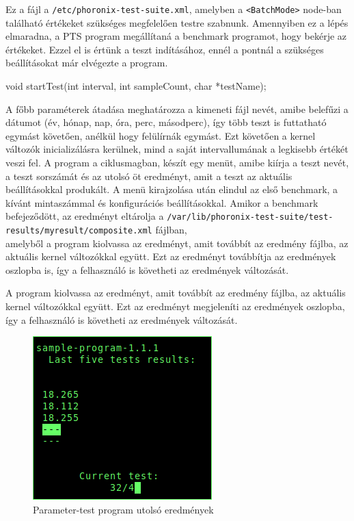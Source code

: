 Ez a fájl a \texttt{/etc/phoronix-test-suite.xml}, amelyben a \texttt{<BatchMode>} node-ban található értékeket szükséges megfelelően testre szabnunk. Amennyiben ez a lépés elmaradna, a PTS program megállítaná a benchmark programot, hogy bekérje az értékeket. Ezzel el is értünk a teszt indításához, ennél a pontnál a szükséges beállításokat már elvégezte a program.
\begin{cpp}
void startTest(int interval, int sampleCount, char *testName);
\end{cpp}
A főbb paraméterek átadása meghatározza a kimeneti fájl nevét, amibe belefűzi a dátumot (év, hónap, nap, óra, perc, másodperc), így több teszt is futtatható egymást követően, anélkül hogy felülírnák egymást.
Ezt követően a kernel változók inicializálásra kerülnek, mind a saját intervallumának a legkisebb értékét veszi fel. A program a ciklusmagban, készít egy menüt, amibe kiírja a teszt nevét, a teszt sorszámát és az utolsó öt eredményt, amit a teszt az aktuális beállításokkal produkált. A menü kirajzolása után elindul az első benchmark, a kívánt mintaszámmal és konfigurációs beállításokkal. Amikor a benchmark befejeződött, az eredményt eltárolja a \texttt{/var/lib/phoronix-test-suite/test-results/myresult/composite.xml} fájlban, \\ amelyből a program kiolvassa az eredményt, amit továbbít az eredmény fájlba, az aktuális kernel változókkal együtt. Ezt az eredményt továbbítja az eredmények oszlopba is, így a felhasználó is követheti az eredmények változását.

\noindent A program kiolvassa az eredményt, amit továbbít az eredmény fájlba, az aktuális kernel változókkal együtt. Ezt az eredményt megjeleníti az eredmények oszlopba, így a felhasználó is követheti az eredmények változását.

\begin{figure}[h!]
\centering
\includegraphics[scale=3.0]{images/parameter-test.png}
\caption{Parameter-test program utolsó eredmények}
\label{fig:parameter-test}
\end{figure}

